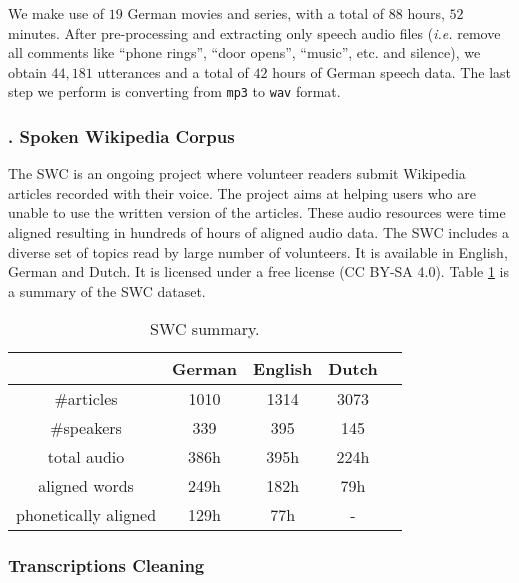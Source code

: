 We make use of $19$ German movies and series, with a total of $88$ hours, $52$ minutes. After pre-processing and extracting only speech
audio files (\textit{i.e.} remove all comments like \enquote{phone rings}, \enquote{door opens}, \enquote{music}, etc. and silence), we obtain $44,181$ utterances and a total of $42$ hours of German speech data. The last step we perform is converting from \texttt{mp3} to \texttt{wav} format. 

\subsubsection{. Spoken Wikipedia Corpus}
\label{meth:s2_sub4_subsub6}

The \acf{SWC} is an ongoing project where volunteer readers submit Wikipedia articles recorded with their voice. The project aims at helping users who are unable to use the written version of the articles. These audio resources were time aligned resulting in hundreds of hours of aligned audio data. The \ac{SWC} includes a diverse set of topics read by large number of volunteers. It is available in English, German and Dutch. It is licensed under a free license (CC BY-SA 4.0). Table \ref{meth:table0} is a summary of the \ac{SWC} dataset.

\begin{table}[!ht]
	\centering
	\begin{tabular}{ || c | c | c | c | c || } 
		\hline
		      &   German &   English    &   Dutch \\ 
		\hline
		\#articles &   1010 &   1314  &   3073    \\
		\hline
		\#speakers &   339 &   395   &   145   \\ 
		\hline
		total audio    &   386h &   395h   &   224h   \\
		\hline
		aligned words   &   249h &   182h  &   79h   \\
		\hline
		phonetically aligned   &   129h &   77h  &   -  \\
		\hline
	\end{tabular}
	\caption{\acf{SWC} summary.}
	\label{meth:table0}
\end{table}

\subsubsection{Transcriptions Cleaning}
\label{meth:s2_sub4_subsub7}

